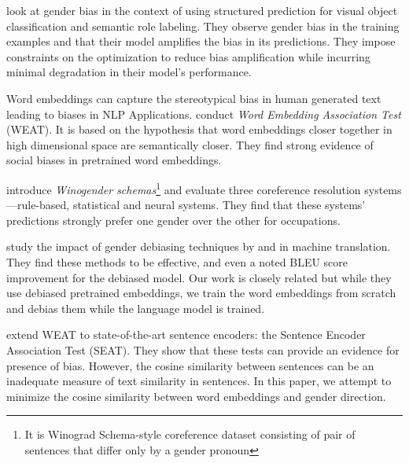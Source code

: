 \documentclass[11pt,a4paper]{article}
\begin{document}
 look at gender bias in the context of using structured prediction for visual object classification and semantic role labeling. They observe gender bias in the training examples and that their model amplifies the bias in its predictions. 
They impose constraints on the optimization to reduce bias amplification while incurring minimal degradation in their model's performance.

Word embeddings can capture the stereotypical bias in human generated text leading to biases in NLP Applications.   conduct \textit{Word Embedding Association Test} (WEAT). It is based on the hypothesis that word embeddings closer together in high dimensional space are semantically closer. They find strong evidence  of social biases in pretrained word embeddings.%


 introduce \textit{Winogender schemas}\footnote{It is Winograd Schema-style coreference dataset consisting of pair of sentences that differ only by a gender pronoun} and  evaluate three coreference resolution systems---rule-based, statistical and neural systems. They find that these systems' predictions  strongly prefer one gender over the other for occupations. %

 study the impact of gender debiasing techniques by \citet{bolukbasi2016man} and \citet{zhao2018b} in machine translation. They find these methods to be effective, and even a noted BLEU score improvement for the debiased model. Our work is closely related but while they use debiased pretrained embeddings, we train the word embeddings from scratch and debias them while the language model is trained. 

 extend WEAT to state-of-the-art sentence encoders: the Sentence Encoder Association Test (SEAT). They show that these tests can provide an evidence for presence of bias. However, the cosine similarity between sentences can be an inadequate measure of text similarity in sentences. In this paper, we attempt to minimize the cosine similarity between word embeddings and gender direction. 

\end{document}
